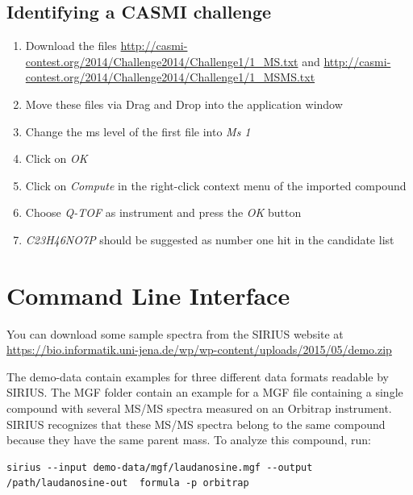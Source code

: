\documentclass[letterpaper,10pt,openany,oneside]{sphinxmanual}
\newcommand\gui[1]{\textsl{\guilsinglleft#1\guilsinglright\xspace}}
\begin{document}
\subsection{Identifying a CASMI challenge}
\label{gui:identifying-a-casmi-challenge}
\begin{enumerate}
	\item {} 
	Download the files \url{http://casmi-contest.org/2014/Challenge2014/Challenge1/1\_MS.txt} and \url{http://casmi-contest.org/2014/Challenge2014/Challenge1/1\_MSMS.txt}
	
	\item {} 
	Move these files via Drag and Drop into the application window
	
	\item {} 
	Change the ms level of the first file into \gui{Ms 1}
	
	\item {} 
	Click on \gui{OK}
	
	\item {} 
	Click on \gui{Compute} in the right-click context menu of the imported compound
	
	\item {} 
	Choose \gui{Q-TOF} as instrument and press the \gui{OK} button
	
	\item {} 
	\emph{C23H46NO7P} should be suggested as number one hit in the candidate list
	
\end{enumerate}


\section{Command Line Interface}
\label{commandline:demo-data}

You can download some sample spectra from the SIRIUS website
at \url{https://bio.informatik.uni-jena.de/wp/wp-content/uploads/2015/05/demo.zip}

The demo-data contain examples for three different data formats readable by
SIRIUS. The MGF folder contain an example for a MGF file containing a single
compound with several MS/MS spectra measured on an Orbitrap
instrument. SIRIUS recognizes that these MS/MS spectra belong to the same
compound because they have the same parent mass. To analyze this compound,
run:
%
\begin{Verbatim}[commandchars=\\\{\}]
sirius --input demo-data/mgf/laudanosine.mgf --output /path/laudanosine-out  formula -p orbitrap 
\end{Verbatim}
\end{document}
